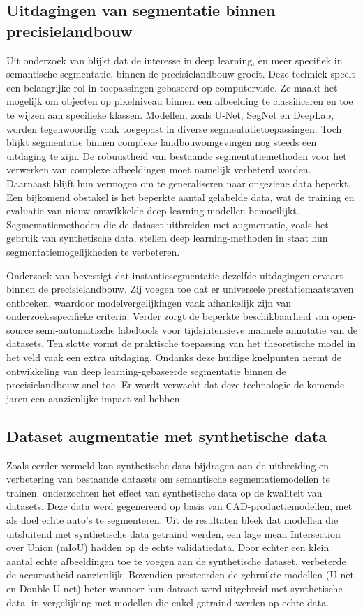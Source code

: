 \subsection{Uitdagingen van segmentatie binnen precisielandbouw}
Uit onderzoek van \textcite{Luo2024} blijkt dat de interesse in deep learning, en meer specifiek in semantische segmentatie, binnen de precisielandbouw groeit. Deze techniek speelt een belangrijke rol in toepassingen gebaseerd op computervisie. Ze maakt het mogelijk om objecten op pixelniveau binnen een afbeelding te classificeren en toe te wijzen aan specifieke klassen. Modellen, zoals U-Net, SegNet en DeepLab, worden tegenwoordig vaak toegepast in diverse segmentatietoepassingen. Toch blijkt segmentatie binnen complexe landbouwomgevingen nog steeds een uitdaging te zijn. De robuustheid van bestaande segmentatiemethoden voor het verwerken van complexe afbeeldingen moet namelijk verbeterd worden. Daarnaast blijft hun vermogen om te generaliseren naar ongeziene data beperkt. Een bijkomend obstakel is het beperkte aantal gelabelde data, wat de training en evaluatie van nieuw ontwikkelde deep learning-modellen bemoeilijkt. Segmentatiemethoden die de dataset uitbreiden met augmentatie, zoals het gebruik van synthetische data, stellen deep learning-methoden in staat hun segmentatiemogelijkheden te verbeteren.

Onderzoek van \textcite{Charisis2024} bevestigt dat instantiesegmentatie dezelfde uitdagingen ervaart binnen de precisielandbouw. Zij voegen toe dat er universele prestatiemaatstaven ontbreken, waardoor modelvergelijkingen vaak afhankelijk zijn van onderzoeksspecifieke criteria. Verder zorgt de beperkte beschikbaarheid van open-source semi-automatische labeltools voor tijdsintensieve manuele annotatie van de datasets. Ten slotte vormt de praktische toepassing van het theoretische model in het veld vaak een extra uitdaging. Ondanks deze huidige knelpunten neemt de ontwikkeling van deep learning-gebaseerde segmentatie binnen de precisielandbouw snel toe. Er wordt verwacht dat deze technologie de komende jaren een aanzienlijke impact zal hebben.

\subsection{Dataset augmentatie met synthetische data}
Zoals eerder vermeld kan synthetische data bijdragen aan de uitbreiding en verbetering van bestaande datasets om semantische segmentatiemodellen te trainen. \textcite{Anderson2022} onderzochten het effect van synthetische data op de kwaliteit van datasets. Deze data werd gegenereerd op basis van CAD-productiemodellen, met als doel echte auto's te segmenteren. Uit de resultaten bleek dat modellen die uitsluitend met synthetische data getraind werden, een lage mean Intersection over Union (mIoU) hadden op de echte validatiedata. Door echter een klein aantal echte afbeeldingen toe te voegen aan de synthetische dataset, verbeterde de accuraatheid aanzienlijk. Bovendien presteerden de gebruikte modellen (U-net en Double-U-net) beter wanneer hun dataset werd uitgebreid met synthetische data, in vergelijking met modellen die enkel getraind werden op echte data.

